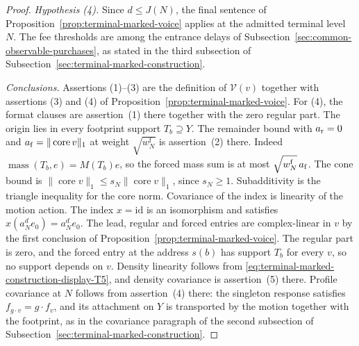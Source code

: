 \begin{proof}
\emph{Hypothesis (4).} Since $d\le J(N)$, the final sentence of
Proposition~\ref{prop:terminal-marked-voice} applies at the admitted
terminal level $N$. The fee thresholds are among the entrance delays of
Subsection~\ref{sec:common-observable-purchases}, as stated in the third
subsection of Subsection~\ref{sec:terminal-marked-construction}.

\emph{Conclusions.} Assertions (1)--(3) are the definition of
$\mathcal V(v)$ together with assertions (3) and (4) of
Proposition~\ref{prop:terminal-marked-voice}. For (4), the format
clauses are assertion~(1) there together with the zero regular part.
The origin lies in every footprint support $T_b\supseteq Y$. The
remainder bound with $a_{\rm r}=0$ and $a_{\rm f}=\|\operatorname{core}v\|_1$
at weight $\sqrt{w^{\mathrm f}_N}$ is assertion~(2) there. Indeed
$\operatorname{mass}(T_b,e)=M(T_b)e$, so the forced mass sum is at most
$\sqrt{w^{\mathrm f}_N}\,a_{\rm f}$. The cone bound is
$\|\operatorname{core}v\|_1\le s_N\|\operatorname{core}v\|_1$, since
$s_N\ge1$. Subadditivity is the triangle inequality for the core norm.
Covariance of the index is linearity of the motion action. The index
$x=\mathrm{id}$ is an isomorphism and satisfies
$x(a_N^de_0)=a_N^de_0$. The lead, regular and forced entries are
complex-linear in $v$ by the first conclusion of
Proposition~\ref{prop:terminal-marked-voice}. The regular part is zero,
and the forced entry at the address $s(b)$ has support $T_b$ for every
$v$, so no support depends on $v$. Density linearity follows from \eqref{eq:terminal-marked-construction-display-T5},
and density covariance is assertion~(5) there. Profile covariance at $N$
follows from assertion~(4) there: the singleton response satisfies
$f_{g\cdot v}=g\cdot f_v$, and its attachment on $Y$ is transported by
the motion together with the footprint, as in the covariance paragraph
of the second subsection of Subsection~\ref{sec:terminal-marked-construction}.
\end{proof}

